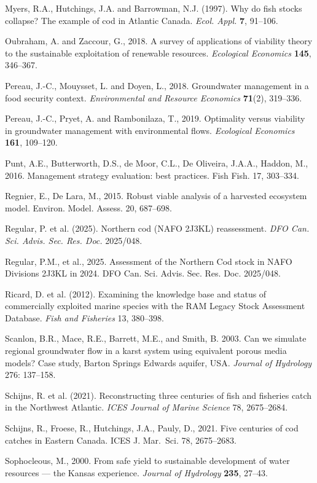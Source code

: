 \documentclass[11pt]{article}
\begin{document}
Myers, R.A., Hutchings, J.A. and Barrowman, N.J. (1997). Why do fish stocks collapse? The
example of cod in Atlantic Canada. \emph{Ecol. Appl.} \textbf{7}, 91--106.

Oubraham, A. and Zaccour, G., 2018. A survey of applications of viability theory to the
sustainable exploitation of renewable resources. \emph{Ecological Economics} \textbf{145},
346--367.

Pereau, J.-C., Mouysset, L. and Doyen, L., 2018. Groundwater management in a food security
context. \emph{Environmental and Resource Economics} \textbf{71}(2), 319--336.

Pereau, J.-C., Pryet, A. and Rambonilaza, T., 2019. Optimality versus viability in groundwater
management with environmental flows. \emph{Ecological Economics} \textbf{161}, 109--120.

Punt, A.E., Butterworth, D.S., de Moor, C.L., De Oliveira, J.A.A., Haddon, M., 2016.
Management strategy evaluation: best practices. Fish Fish. 17, 303--334.

Regnier, E., De Lara, M., 2015. Robust viable analysis of a harvested ecosystem model.
Environ. Model. Assess. 20, 687--698.

Regular, P. et al. (2025). Northern cod (NAFO 2J3KL) reassessment.
\emph{DFO Can. Sci. Advis. Sec. Res. Doc.} 2025/048.

Regular, P.M., et al., 2025. Assessment of the Northern Cod stock in
NAFO Divisions 2J3KL in 2024. DFO Can. Sci. Advis. Sec. Res. Doc.
2025/048.

Ricard, D. et al. (2012). Examining the knowledge base and status of
commercially exploited marine species with the RAM Legacy Stock
Assessment Database. \emph{Fish and Fisheries} 13, 380--398.

Scanlon, B.R., Mace, R.E., Barrett, M.E., and Smith, B. 2003. Can we
simulate regional groundwater flow in a karst system using equivalent
porous media models? Case study, Barton Springs Edwards aquifer, USA.
\emph{Journal of Hydrology} 276: 137--158.

Schijns, R. et al. (2021). Reconstructing three centuries of fish and
fisheries catch in the Northwest Atlantic. \emph{ICES Journal of Marine
Science} 78, 2675--2684.

Schijns, R., Froese, R., Hutchings, J.A., Pauly, D., 2021.
Five centuries of cod catches in Eastern Canada. ICES J. Mar.~Sci. 78,
2675--2683.

Sophocleous, M., 2000. From safe yield to sustainable development of water resources --- the
Kansas experience. \emph{Journal of Hydrology} \textbf{235}, 27--43.
\end{document}
